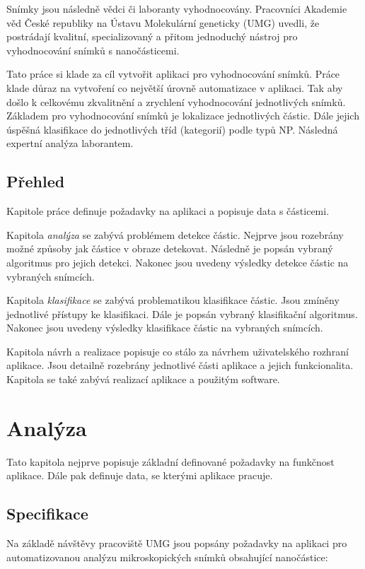 \documentclass[11pt,twoside,a4paper,table]{book}
\begin{document}
Snímky jsou následně vědci či laboranty vyhodnocovány. Pracovníci Akademie věd České republiky na Ústavu Molekulární geneticky (UMG) uvedli, že postrádají kvalitní, specializovaný a přitom jednoduchý nástroj pro vyhodnocování snímků s nanočásticemi.

Tato práce si klade za cíl vytvořit aplikaci pro vyhodnocování snímků. Práce klade důraz na vytvoření co největší úrovně automatizace v aplikaci. Tak aby došlo k celkovému zkvalitnění a zrychlení vyhodnocování jednotlivých snímků. Základem pro vyhodnocování snímků je lokalizace jednotlivých částic. Dále jejich úspěšná klasifikace do jednotlivých tříd (kategorií) podle typů NP. Následná expertní analýza laborantem.

\section{Přehled}
Kapitole práce definuje požadavky na aplikaci a popisuje data s částicemi.

Kapitola \textit{analýza} se zabývá problémem detekce částic. Nejprve jsou rozebrány možné způsoby jak částice v obraze detekovat. Následně je popsán vybraný algoritmus pro jejich detekci. Nakonec jsou uvedeny výsledky detekce částic na vybraných snímcích.

Kapitola \textit{klasifikace} se zabývá problematikou klasifikace částic. Jsou zmíněny jednotlivé přístupy ke klasifikaci. Dále je popsán vybraný klasifikační algoritmus. Nakonec jsou uvedeny výsledky klasifikace částic na vybraných snímcích.

Kapitola návrh a realizace popisuje co stálo za návrhem uživatelského rozhraní aplikace. Jsou detailně rozebrány jednotlivé části aplikace a jejich funkcionalita. Kapitola se také zabývá realizací aplikace a použitým software.

\chapter{Analýza}
Tato kapitola nejprve popisuje základní definované požadavky na funkčnost aplikace. Dále pak definuje data, se kterými aplikace pracuje. 

\section{Specifikace}
Na základě návštěvy pracoviště UMG jsou popsány požadavky na aplikaci pro automatizovanou analýzu mikroskopických snímků obsahující nanočástice:
\end{document}
